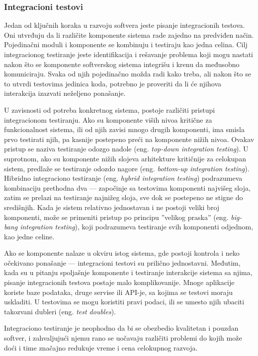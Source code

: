 \documentclass[12pt,oneside]{memoir}
\begin{document}
\subsubsection{Integracioni testovi}
\label{sec:integration}
\par Jedan od ključnih koraka u razvoju softvera jeste pisanje integracionih testova. Oni utvrđuju da li različite komponente sistema rade zajedno na predviđen način. Pojedinačni moduli i komponente se kombinuju i testiraju kao jedna celina. Cilj integracionog testiranje jeste identifikacija i rešavanje problema koji mogu nastati nakon što se komponente softverskog sistema integrišu i krenu da međusobno komuniciraju. Svaka od njih pojedinačno možda radi kako treba, ali nakon što se to utvrdi testovima jedinica koda, potrebno je proveriti da li će njihova interakcija izazvati neželjeno ponašanje. 
\par U zavisnosti od potreba konkretnog sistema, postoje različiti pristupi integracionom testiranju. Ako su komponente viših nivoa kritične za funkcionalnost sistema, ili od njih zavisi mnogo drugih komponenti, ima smisla prvo testirati njih, pa kasnije postepeno preći na komponente nižih nivoa. Ovakav pristup se naziva testiranje odozgo nadole (eng. \emph{top-down integration testing}). U suprotnom, ako su komponente nižih slojeva arhitekture kritičnije za celokupan sistem, predlaže se testiranje odozdo nagore (eng. \emph{bottom-up integration testing}). Hibridno integraciono testiranje (eng. \emph{hybrid integration testing}) podrazumeva kombinaciju prethodna dva --- započinje sa testovima komponenti najvišeg sloja, zatim se prelazi na testiranje najnižeg sloja, sve dok se postepeno ne stigne do središnjih. Kada je sistem relativno jednostavan i ne postoji veliki broj komponenti, može se primeniti pristup po principu ''velikog praska'' (eng. \emph{big-bang integration testing}), koji podrazumeva testiranje svih komponenti odjednom, kao jedne celine. 
\par Ako se komponente nalaze u okviru istog sistema, gde postoji kontrola i neko očekivano ponašanje --- integracioni testovi su prilično jednostavni. Međutim, kada su u pitanju spoljašnje komponente i testiranje interakcije sistema sa njima, pisanje integracionih testova postaje malo komplikovanije. Mnoge aplikacije koriste baze podataka, druge servise ili API-je, sa kojima se testovi moraju uskladiti. U testovima se mogu koristiti pravi podaci, ili se umesto njih ubaciti takozvani dubleri (eng. \textit{test doubles}).
\par Integraciono testiranje je neophodno da bi se obezbedio kvalitetan i pouzdan softver, i zahvaljujući njemu rano se uočavaju različiti problemi do kojih može doći i time značajno redukuje vreme i cena celokupnog razvoja. 
\end{document}
